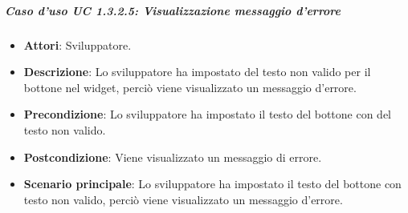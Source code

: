 \subparagraph{Caso d'uso UC 1.3.2.5: Visualizzazione messaggio d'errore}

\FloatBarrier
\begin{itemize}
\item\textbf{Attori}: Sviluppatore.
\item\textbf{Descrizione}: Lo sviluppatore ha impostato del testo non valido per il bottone nel widget, perciò viene visualizzato un messaggio d'errore.
\item\textbf{Precondizione}: Lo sviluppatore ha impostato il testo del bottone con del testo non valido.
\item\textbf{Postcondizione}: Viene visualizzato un messaggio di errore.
\item \textbf{Scenario principale}: Lo sviluppatore ha impostato il testo del bottone con testo non valido, perciò viene visualizzato un messaggio d'errore.
\end{itemize}